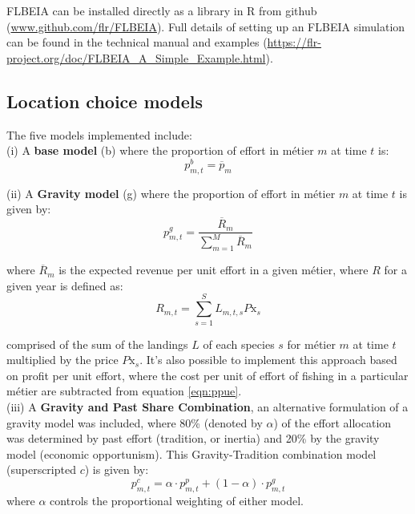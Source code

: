 \documentclass[12pt, halfline, a4paper]{ouparticle}
\begin{document}
FLBEIA can be installed directly as a library in R from github
(\url{www.github.com/flr/FLBEIA}).  Full details of setting up an FLBEIA
simulation can be found in the technical manual \citep{Garcia2017a} and
examples (\url{https://flr-project.org/doc/FLBEIA_A_Simple_Example.html}). 

\subsection{Location choice models}

The five models implemented include:\\

(i) A \textbf{base model} (b) where the proportion of effort in métier $m$ at time
$t$ is:
\begin{equation}
p^{b}_{m,t} = \overline{p}_{m}
\end{equation}

(ii) A \textbf{Gravity model} (g) where the proportion of effort in métier $m$ at
time $t$ is given by: 
\begin{equation}
p^{g}_{m,t} = \frac{\overline{R}_{m}}{\sum\limits_{m=1}^{M}\overline{R}_{m}} 
\end{equation}

where $\overline{R}_m$ is the expected revenue per unit effort in a given
métier, where $R$ for a given year is defined as: 
\begin{equation}
R_{m,t} =  \sum\limits_{s=1}^{S} L_{m,t,s} P\text{x}_{s} 
\label{eqn:ppue}
\end{equation}

comprised of the sum of the landings $L$ of each species $s$ for métier $m$ at
time $t$ multiplied by the price $P\text{x}_{s}$. It's also possible to
implement this approach based on profit per unit effort, where the cost per
unit of effort of fishing in a particular métier are subtracted from equation
\ref{eqn:ppue}. \\

(iii) A \textbf{Gravity and Past Share Combination}, an alternative formulation
of a gravity model was included, where 80\% (denoted by $\alpha$) of the effort
allocation was determined by past effort (tradition, or inertia) and 20\% by
the gravity model (economic opportunism). This Gravity-Tradition combination
model (superscripted $c$) is given by:
\begin{equation}
	p^{c}_{m,t} = \alpha \cdot p^{p}_{m,t} + (1 - \alpha) \cdot p^{g}_{m,t}
\end{equation}
where $\alpha$ controls the proportional weighting of either model. \\ 
\end{document}
